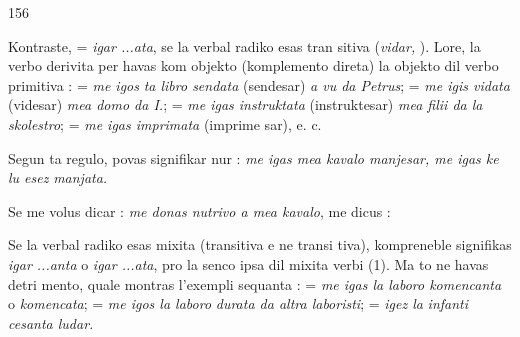 \begin{VUpage}[160]{156}

Kontraste,  = \textit{igar ...ata}, se la verbal radiko esas tran\cc
sitiva (\textit{vidar, }). Lore, la verbo derivita per  havas\nl
kom objekto (komplemento direta) la objekto dil verbo\nl
primitiva :  = \textit{me igos}\nl
\textit{ta libro sendata} (sendesar) \textit{a vu da Petrus}; \cc
{} = \textit{me igis vidata} (videsar) \textit{mea domo da I.}; \nl
{} = \textit{me igas instruktata}\nl
(instruktesar) \textit{mea filii da la skolestro}; \nl
{} = \textit{me igas imprimata} (imprime\cc
sar), e. c.

Segun ta regulo,  povas signifikar\nl
nur : \textit{me igas mea kavalo manjesar, me igas ke lu esez}\nl
\textit{manjata.}

Se me volus dicar : \textit{me donas nutrivo a mea kavalo}, me\nl
dicus : 

Se la verbal radiko esas mixita (transitiva e ne transi\cc
tiva),  kompreneble signifikas \textit{igar ...anta} o \textit{igar ...ata},\nl
pro la senco ipsa dil mixita verbi (1). Ma to ne havas detri\cc
mento, quale montras l'exempli sequanta : \nl
{} = \textit{me igas la laboro komencanta} o \textit{komencata}; \nl
{} = \textit{me igos la laboro}\nl
\textit{durata da altra laboristi};  = \textit{igez la}\nl
\textit{infanti cesanta ludar.}


\end{VUpage}
